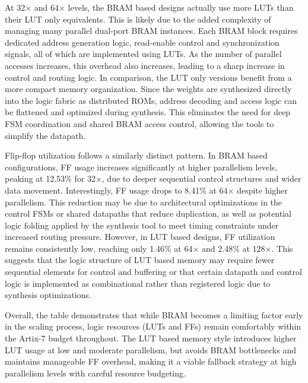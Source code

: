 \documentclass[a4paper,12pt]{report}
\begin{document}
At 32$\times$ and 64$\times$ levels, the BRAM based designs actually use more LUTs than their LUT only equivalents. This is likely due to the added complexity of managing many parallel dual-port BRAM instances. Each BRAM block requires dedicated address generation logic, read-enable control and synchronization signals, all of which are implemented using LUTs. As the number of parallel accesses increases, this overhead also increases, leading to a sharp increase in control and routing logic.
In comparison, the LUT only versions benefit from a more compact memory organization. Since the weights are synthesized directly into the logic fabric as distributed ROMs, address decoding and access logic can be flattened and optimized during synthesis. This eliminates the need for deep FSM coordination and shared BRAM access control, allowing the tools to simplify the datapath. 

Flip-flop utilization follows a similarly distinct pattern. In BRAM based configurations, FF usage increases significantly at higher parallelism levels, peaking at 12.53\% for 32$\times$, due to deeper sequential control structures and wider data movement. Interestingly, FF usage drops to 8.41\% at 64$\times$ despite higher parallelism. This reduction may be due to architectural optimizations in the control FSMs or shared datapaths that reduce duplication, as well as potential logic folding applied by the synthesis tool to meet timing constraints under increased routing pressure. 
However, in LUT based designs, FF utilization remains consistently low, reaching only 1.46\% at 64$\times$ and 2.48\% at 128$\times$. This suggests that the logic structure of LUT based memory may require fewer sequential elements for control and buffering or that certain datapath and control logic is implemented as combinational rather than registered logic due to synthesis optimizations.

Overall, the table demonstrates that while BRAM becomes a limiting factor early in the scaling process, logic resources (LUTs and FFs) remain comfortably within the Artix-7 budget throughout. The LUT based memory style introduces higher LUT usage at low and moderate parallelism, but avoids BRAM bottlenecks and maintains manageable FF overhead, making it a viable fallback strategy at high parallelism levels with careful resource budgeting.
\end{document}
